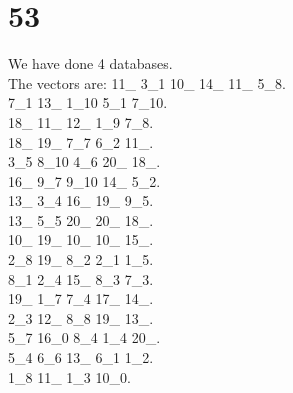\chapter{53}
\indent We have done 4 databases.\\
The vectors are:
11\_ 3\_1 10\_ 14\_ 11\_ 5\_8.\\7\_1 13\_ 1\_10 5\_1 7\_10.\\18\_ 11\_ 12\_ 1\_9 7\_8.\\18\_ 19\_ 7\_7 6\_2 11\_.\\3\_5 8\_10 4\_6 20\_ 18\_.\\16\_ 9\_7 9\_10 14\_ 5\_2.\\13\_ 3\_4 16\_ 19\_ 9\_5.\\13\_ 5\_5 20\_ 20\_ 18\_.\\10\_ 19\_ 10\_ 10\_ 15\_.\\2\_8 19\_ 8\_2 2\_1 1\_5.\\8\_1 2\_4 15\_ 8\_3 7\_3.\\19\_ 1\_7 7\_4 17\_ 14\_.\\2\_3 12\_ 8\_8 19\_ 13\_.\\5\_7 16\_0 8\_4 1\_4 20\_.\\5\_4 6\_6 13\_ 6\_1 1\_2.\\1\_8 11\_ 1\_3 10\_0.\\